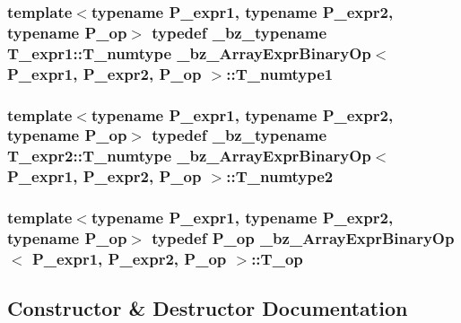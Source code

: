 \subsubsection[{T\+\_\+numtype1}]{\setlength{\rightskip}{0pt plus 5cm}template$<$typename P\+\_\+expr1, typename P\+\_\+expr2, typename P\+\_\+op$>$ typedef {\bf \+\_\+bz\+\_\+typename} T\+\_\+expr1\+::\+T\+\_\+numtype {\bf \+\_\+bz\+\_\+\+Array\+Expr\+Binary\+Op}$<$ P\+\_\+expr1, P\+\_\+expr2, P\+\_\+op $>$\+::{\bf T\+\_\+numtype1}}\label{class__bz__ArrayExprBinaryOp_a476876cf5d5b81e475d3d11cc3c2cf37}
\hypertarget{class__bz__ArrayExprBinaryOp_a0215bafa1cef89a153255579d332d7a1}{}
\subsubsection[{T\+\_\+numtype2}]{\setlength{\rightskip}{0pt plus 5cm}template$<$typename P\+\_\+expr1, typename P\+\_\+expr2, typename P\+\_\+op$>$ typedef {\bf \+\_\+bz\+\_\+typename} T\+\_\+expr2\+::\+T\+\_\+numtype {\bf \+\_\+bz\+\_\+\+Array\+Expr\+Binary\+Op}$<$ P\+\_\+expr1, P\+\_\+expr2, P\+\_\+op $>$\+::{\bf T\+\_\+numtype2}}\label{class__bz__ArrayExprBinaryOp_a0215bafa1cef89a153255579d332d7a1}
\hypertarget{class__bz__ArrayExprBinaryOp_a66e4dec28822c9524aadba055c096054}{}
\subsubsection[{T\+\_\+op}]{\setlength{\rightskip}{0pt plus 5cm}template$<$typename P\+\_\+expr1, typename P\+\_\+expr2, typename P\+\_\+op$>$ typedef P\+\_\+op {\bf \+\_\+bz\+\_\+\+Array\+Expr\+Binary\+Op}$<$ P\+\_\+expr1, P\+\_\+expr2, P\+\_\+op $>$\+::{\bf T\+\_\+op}}\label{class__bz__ArrayExprBinaryOp_a66e4dec28822c9524aadba055c096054}


\subsection{Constructor \& Destructor Documentation}
\hypertarget{class__bz__ArrayExprBinaryOp_ac01ce3626e8698866e4d0d6ad692940e}{}
